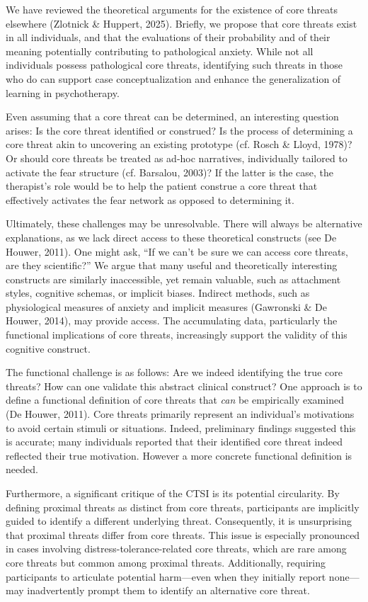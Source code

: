 \documentclass[
  man,floatsintext]{apa7}
\begin{document}
We have reviewed the theoretical arguments for the existence of core threats elsewhere (Zlotnick \& Huppert, 2025).
Briefly, we propose that core threats exist in all individuals, and that the evaluations of their probability and of their meaning potentially contributing to pathological anxiety.
While not all individuals possess pathological core threats, identifying such threats in those who do can support case conceptualization and enhance the generalization of learning in psychotherapy.

Even assuming that a core threat can be determined, an interesting question arises: Is the core threat identified or construed?
Is the process of determining a core threat akin to uncovering an existing prototype (cf. Rosch \& Lloyd, 1978)?
Or should core threats be treated as ad-hoc narratives, individually tailored to activate the fear structure (cf. Barsalou, 2003)?
If the latter is the case, the therapist's role would be to help the patient construe a core threat that effectively activates the fear network as opposed to determining it.

Ultimately, these challenges may be unresolvable.
There will always be alternative explanations, as we lack direct access to these theoretical constructs (see De Houwer, 2011).
One might ask, ``If we can't be sure we can access core threats, are they scientific?''
We argue that many useful and theoretically interesting constructs are similarly inaccessible, yet remain valuable, such as attachment styles, cognitive schemas, or implicit biases.
Indirect methods, such as physiological measures of anxiety and implicit measures (Gawronski \& De Houwer, 2014), may provide access.
The accumulating data, particularly the functional implications of core threats, increasingly support the validity of this cognitive construct.

The functional challenge is as follows: Are we indeed identifying the true core threats?
How can one validate this abstract clinical construct?
One approach is to define a functional definition of core threats that \emph{can} be empirically examined (De Houwer, 2011).
Core threats primarily represent an individual's motivations to avoid certain stimuli or situations.
Indeed, preliminary findings suggested this is accurate; many individuals reported that their identified core threat indeed reflected their true motivation.
However a more concrete functional definition is needed.

Furthermore, a significant critique of the CTSI is its potential circularity.
By defining proximal threats as distinct from core threats, participants are implicitly guided to identify a different underlying threat.
Consequently, it is unsurprising that proximal threats differ from core threats.
This issue is especially pronounced in cases involving distress-tolerance-related core threats, which are rare among core threats but common among proximal threats.
Additionally, requiring participants to articulate potential harm---even when they initially report none---may inadvertently prompt them to identify an alternative core threat.
\end{document}
